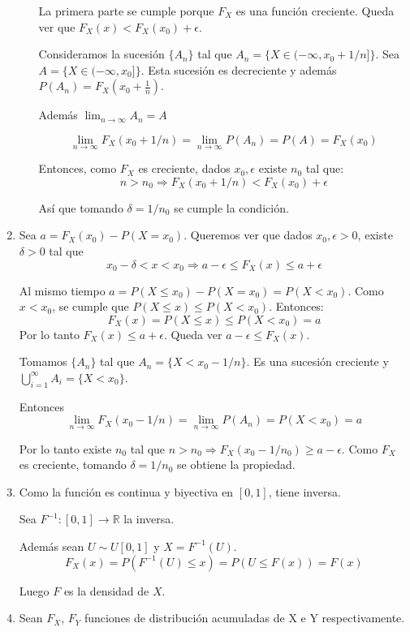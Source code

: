 \begin{enumerate}
\begin{enumerate}
					La primera parte se cumple porque $F_X$ es una función creciente. Queda ver que $F_X(x) < F_X(x_0) + \epsilon$.
					
					Consideramos la sucesión $\{A_n\}$ tal que $A_n = \{X \in (-\infty, x_0 + 1/n]\}$. Sea $A = \{X \in (-\infty, x_0]\}$.
					Esta sucesión es decreciente y además $P(A_n) = F_X(x_0+\frac{1}{n})$.
					
					Además $\lim_{n\rightarrow \infty}A_n = A$
					
					$$\lim_{n\rightarrow \infty}F_X(x_0 + 1/n) = \lim_{n\rightarrow \infty}P(A_n) = P(A) = F_X(x_0)$$
					
					Entonces, como $F_X$ es creciente, dados $x_0, \epsilon$ existe $n_0$ tal que:
					$$n > n_0 \Rightarrow F_X(x_0 + 1/n) < F_X(x_0) + \epsilon$$
					
					Así que tomando $\delta = 1/n_0$ se cumple la condición.
			\end{enumerate}
	\item
		Sea $a = F_X(x_0) - P(X=x_0)$. Queremos ver que dados $x_0, \epsilon > 0$, existe $\delta > 0$ tal que
		$$x_0 - \delta < x < x_0 \Rightarrow a - \epsilon \leq F_X(x) \leq a + \epsilon$$
		
		Al mismo tiempo $a = P(X\leq x_0) - P(X=x_0) = P(X < x_0)$.
		Como $x < x_0$, se cumple que $P(X\leq x) \leq P(X<x_0)$. Entonces:
		$$F_X(x) = P(X\leq x) \leq P(X<x_0) = a$$
		Por lo tanto $F_X(x) \leq a + \epsilon$. Queda ver $a - \epsilon \leq F_X(x)$.
		
		Tomamos $\{A_n\}$ tal que $A_n=\{X < x_0-1/n\}$. Es una sucesión creciente y $\bigcup_{i=1}^{\infty}A_i = \{X<x_0\}$.
		
		Entonces $$\lim_{n\rightarrow\infty}F_X(x_0 - 1/n) = \lim_{n\rightarrow\infty}P(A_n) = P(X < x_0) = a$$
		
		Por lo tanto existe $n_0$ tal que $n>n_0\Rightarrow F_X(x_0 - 1/n_0) \geq a - \epsilon$.
		Como $F_X$ es creciente, tomando $\delta = 1/n_0$ se obtiene la propiedad. 
	\item
		Como la función es continua y biyectiva en $[0,1]$, tiene inversa.
		
		Sea $F^{-1}:[0,1]\rightarrow \mathbb{R}$ la inversa.
		
		Además sean $U\sim U[0,1]$ y $X = F^{-1}(U)$.
		$$F_X(x) = P(F^{-1}(U) \leq x) = P(U\leq F(x)) = F(x)$$
		
		Luego $F$ es la densidad de $X$.
	\item
		
    Sean $F_X$, $F_Y$ funciones de distribución acumuladas de X e Y respectivamente.
    

\end{enumerate}
